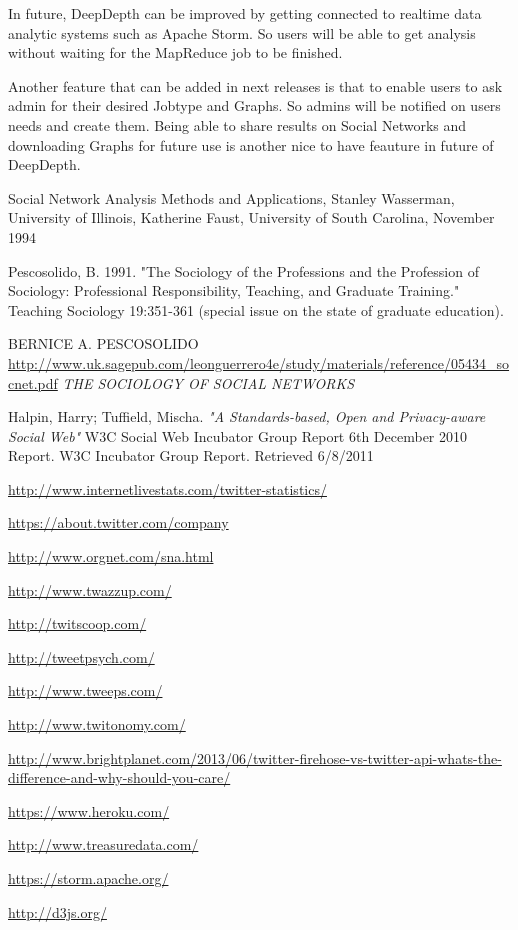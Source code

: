 \documentclass[a4paper,11pt]{report}
\begin{document}
In future, DeepDepth can be improved by getting connected to realtime data analytic systems such as Apache Storm. So users will be able to get analysis without waiting for the MapReduce job to be finished.

Another feature that can be added in next releases is that to enable users to ask admin for their desired Jobtype and Graphs. So admins will be notified on users needs and create them. Being able to share results on Social Networks and downloading Graphs for future use is another nice to have feauture in future of DeepDepth.

\begin{thebibliography}{9}

	Social Network Analysis Methods and Applications, Stanley Wasserman, University of Illinois, Katherine Faust, University of South Carolina, November 1994
    
	Pescosolido, B. 1991. "The Sociology of the Professions and the Profession of Sociology: Professional
Responsibility, Teaching, and Graduate Training." Teaching Sociology 19:351-361 (special issue on the
state of graduate education).

	BERNICE A. PESCOSOLIDO
    \url{http://www.uk.sagepub.com/leonguerrero4e/study/materials/reference/05434_socnet.pdf}
    \emph{THE SOCIOLOGY OF SOCIAL NETWORKS}  
    
  Halpin, Harry; Tuffield, Mischa.
  \emph{"A Standards-based, Open and Privacy-aware Social Web"}
  W3C Social Web Incubator Group Report 6th December 2010 Report. W3C Incubator Group Report. Retrieved 6/8/2011
    
	\url{http://www.internetlivestats.com/twitter-statistics/}
    
	\url{https://about.twitter.com/company}
    
	\url{http://www.orgnet.com/sna.html}
    
	\url{http://www.twazzup.com/}

	\url{http://twitscoop.com/}
    
	\url{http://tweetpsych.com/}
    
	\url{http://www.tweeps.com/}
    
	\url{http://www.twitonomy.com/}
    
	\url{http://www.brightplanet.com/2013/06/twitter-firehose-vs-twitter-api-whats-the-difference-and-why-should-you-care/}

	\url{https://www.heroku.com/}
    
	\url{http://www.treasuredata.com/}

	\url{https://storm.apache.org/}
    
	\url{http://d3js.org/}
    

\end{thebibliography}
\end{document}
